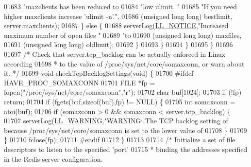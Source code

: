 \begin{DoxyCode}
{{{{{{{{{{{{{{{{{{{{{{01683                     \textcolor{stringliteral}{"maxclients has been reduced to %
01684                     \textcolor{stringliteral}{"low ulimit. "}
01685                     \textcolor{stringliteral}{"If you need higher maxclients increase 'ulimit -n'."},
01686                     (\textcolor{keywordtype}{unsigned} \textcolor{keywordtype}{long} \textcolor{keywordtype}{long}) bestlimit, server.maxclients);
01687             \} \textcolor{keywordflow}{else} \{
01688                 serverLog(\hyperlink{server_8h_a8c54c191e436c7dd3012167212692401}{LL\_NOTICE},\textcolor{stringliteral}{"Increased maximum number of open files "}
01689                     \textcolor{stringliteral}{"to %
01690                     (\textcolor{keywordtype}{unsigned} \textcolor{keywordtype}{long} \textcolor{keywordtype}{long}) maxfiles,
01691                     (\textcolor{keywordtype}{unsigned} \textcolor{keywordtype}{long} \textcolor{keywordtype}{long}) oldlimit);
01692             \}
01693         \}
01694     \}
01695 \}
01696 
01697 \textcolor{comment}{/* Check that server.tcp\_backlog can be actually enforced in Linux according}
01698 \textcolor{comment}{ * to the value of /proc/sys/net/core/somaxconn, or warn about it. */}
01699 \textcolor{keywordtype}{void} checkTcpBacklogSettings(\textcolor{keywordtype}{void}) \{
01700 \textcolor{preprocessor}{#}\textcolor{preprocessor}{ifdef} HAVE\_PROC\_SOMAXCONN
01701     FILE *fp = fopen(\textcolor{stringliteral}{"/proc/sys/net/core/somaxconn"},\textcolor{stringliteral}{"r"});
01702     \textcolor{keywordtype}{char} buf[1024];
01703     \textcolor{keywordflow}{if} (!fp) \textcolor{keywordflow}{return};
01704     \textcolor{keywordflow}{if} (fgets(buf,\textcolor{keyword}{sizeof}(buf),fp) != NULL) \{
01705         \textcolor{keywordtype}{int} somaxconn = atoi(buf);
01706         \textcolor{keywordflow}{if} (somaxconn > 0 && somaxconn < server.tcp\_backlog) \{
01707             serverLog(\hyperlink{server_8h_a31229b9334bba7d6be2a72970967a14b}{LL\_WARNING},\textcolor{stringliteral}{"WARNING: The TCP backlog setting of %
       because /proc/sys/net/core/somaxconn is set to the lower value of %
01708         \}
01709     \}
01710     fclose(fp);
01711 \textcolor{preprocessor}{#}\textcolor{preprocessor}{endif}
01712 \}
01713 
01714 \textcolor{comment}{/* Initialize a set of file descriptors to listen to the specified 'port'}
01715 \textcolor{comment}{ * binding the addresses specified in the Redis server configuration.}
}}}}}}}}}}}}}}}}}}}}}}}}}
\end{DoxyCode}

